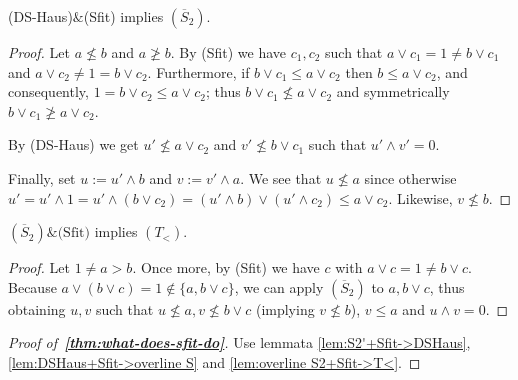 \begin{lem} \label{lem:DSHaus+Sfit->overline S}
  (DS-Haus)$\&$(Sfit) implies $(\overline{S}_2)$.
\end{lem}
\begin{proof}
  Let $a\not\le b$ and $a\not\ge b$.
  By (Sfit) we have $c_1, c_2$ such that $a \vee c_1 = 1 \ne b \vee c_1$ and $a
  \vee c_2 \ne 1 = b \vee c_2$.
  Furthermore, if $b \vee c_1 \le a \vee c_2$ then $b \le a \vee c_2$, and
  consequently, $1 = b \vee c_2 \le a \vee c_2$;
  thus $b \vee c_1 \not\le a \vee c_2$ and symmetrically $b \vee c_1 \not\ge a
  \vee c_2$.

  By (DS-Haus) we get $u'\not\le a \vee c_2$ and $v'\not\le b \vee c_1$ such
  that $u' \wedge v' = 0$.

  Finally, set $u := u' \wedge b$ and $v := v' \wedge a$.
  We see that $u\not\le a$ since otherwise $u' = u' \wedge 1 = u' \wedge (b
  \vee c_2) = (u' \wedge b) \vee (u' \wedge c_2) \le a \vee c_2$.
  Likewise, $v\not\le b$.
\end{proof}

\begin{lem} \label{lem:overline S2+Sfit->T<}
  $(\overline{S}_2)\&\text{(Sfit)}$ implies $(T_<)$.
\end{lem}
\begin{proof}
  Let $1 \ne a > b$.
  Once more, by (Sfit) we have $c$ with $a \vee c = 1 \ne b \vee c$.
  Because $a \vee (b \vee c) = 1 \not\in \{ a, b \vee c \}$, we can apply
  $(\overline{S}_2)$ to $a, b \vee c$, thus obtaining $u, v$ such that
  $u\not\le a, v\not\le b \vee c$ (implying $v\not\le b$), $v \le a$ and $u
  \wedge v = 0$.
\end{proof}

\begin{proof}[Proof of~{\bf \ref{thm:what-does-sfit-do}}]
  Use lemmata \ref{lem:S2'+Sfit->DSHaus}, \ref{lem:DSHaus+Sfit->overline S} and
  \ref{lem:overline S2+Sfit->T<}.
\end{proof}
